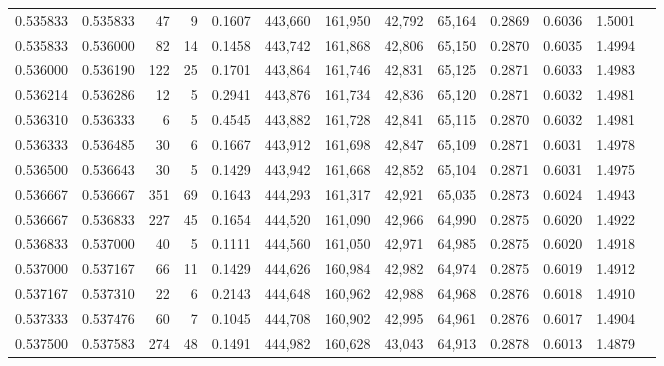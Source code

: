 \begin{tabular}{rrrrrrrrrrrrr}
0.535833 & 0.535833 &    47 &   9 &                                     0.1607 & 443,660 & 161,950 &  42,792 &  65,164 & 0.2869 & 0.6036 & 1.5001 \\
0.535833 & 0.536000 &    82 &  14 &                                     0.1458 & 443,742 & 161,868 &  42,806 &  65,150 & 0.2870 & 0.6035 & 1.4994 \\
0.536000 & 0.536190 &   122 &  25 &                                     0.1701 & 443,864 & 161,746 &  42,831 &  65,125 & 0.2871 & 0.6033 & 1.4983 \\
0.536214 & 0.536286 &    12 &   5 &                                     0.2941 & 443,876 & 161,734 &  42,836 &  65,120 & 0.2871 & 0.6032 & 1.4981 \\
0.536310 & 0.536333 &     6 &   5 &                                     0.4545 & 443,882 & 161,728 &  42,841 &  65,115 & 0.2870 & 0.6032 & 1.4981 \\
0.536333 & 0.536485 &    30 &   6 &                                     0.1667 & 443,912 & 161,698 &  42,847 &  65,109 & 0.2871 & 0.6031 & 1.4978 \\
0.536500 & 0.536643 &    30 &   5 &                                     0.1429 & 443,942 & 161,668 &  42,852 &  65,104 & 0.2871 & 0.6031 & 1.4975 \\
0.536667 & 0.536667 &   351 &  69 &                                     0.1643 & 444,293 & 161,317 &  42,921 &  65,035 & 0.2873 & 0.6024 & 1.4943 \\
0.536667 & 0.536833 &   227 &  45 &                                     0.1654 & 444,520 & 161,090 &  42,966 &  64,990 & 0.2875 & 0.6020 & 1.4922 \\
0.536833 & 0.537000 &    40 &   5 &                                     0.1111 & 444,560 & 161,050 &  42,971 &  64,985 & 0.2875 & 0.6020 & 1.4918 \\
0.537000 & 0.537167 &    66 &  11 &                                     0.1429 & 444,626 & 160,984 &  42,982 &  64,974 & 0.2875 & 0.6019 & 1.4912 \\
0.537167 & 0.537310 &    22 &   6 &                                     0.2143 & 444,648 & 160,962 &  42,988 &  64,968 & 0.2876 & 0.6018 & 1.4910 \\
0.537333 & 0.537476 &    60 &   7 &                                     0.1045 & 444,708 & 160,902 &  42,995 &  64,961 & 0.2876 & 0.6017 & 1.4904 \\
0.537500 & 0.537583 &   274 &  48 &                                     0.1491 & 444,982 & 160,628 &  43,043 &  64,913 & 0.2878 & 0.6013 & 1.4879 \\

\end{tabular}
